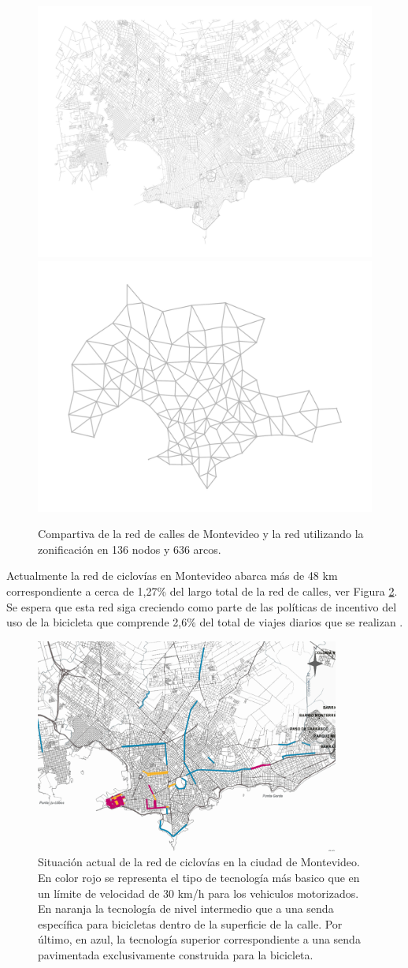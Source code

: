 \begin{figure}[h!]
  \centering
  \includegraphics[width=.49\linewidth]{../resources/montevideo_full.png}
  \includegraphics[width=.49\linewidth]{../resources/montevideo_simple.png}
  \caption{Compartiva de la red de calles de Montevideo y la red utilizando la zonificación en 136 nodos y 636 arcos.}
  \label{fig:montevideosimplification}
\end{figure}

Actualmente la red de ciclovías en Montevideo abarca más de 48 km correspondiente a cerca de 1,27\% del largo total de la red de calles, ver Figura \ref{fig:montevideobikeways}. Se espera que esta red siga creciendo como parte de las políticas de incentivo del uso de la bicicleta que comprende 2,6\% del total de viajes diarios que se realizan \parencite{Mauttone2017a}.

\begin{figure}[h!]
  \centering
  \includegraphics[width=10cm]{../resources/bicicircuitos_montevideo.png}
  \caption{Situación actual de la red de ciclovías en la ciudad de Montevideo. En color rojo se representa el tipo de tecnología más basico que en un límite de velocidad de 30 km/h para los vehiculos motorizados. En naranja la tecnología de nivel intermedio que a una senda específica para bicicletas dentro de la superficie de la calle. Por último, en azul, la tecnología superior correspondiente a una senda pavimentada exclusivamente construida para la bicicleta.}
  \label{fig:montevideobikeways}
\end{figure}

